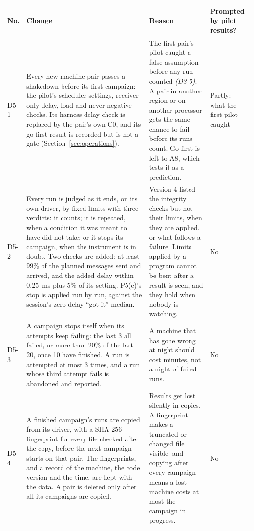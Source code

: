 \documentclass[11pt]{article}
\newcommand{\gl}[1]{{\color{soft}\itshape\small (#1)}}
\begin{document}
{\small
\begin{longtable}{@{}p{1.0cm} >{\raggedright\arraybackslash}p{6.6cm} >{\raggedright\arraybackslash}p{5.9cm} >{\raggedright\arraybackslash}p{1.9cm}@{}}
\toprule
\textbf{No.} & \textbf{Change} & \textbf{Reason} & \textbf{Prompted by pilot results?} \\
\midrule
\endhead
D5-1 & Every new machine pair passes a shakedown before its first campaign: the pilot's scheduler-settings, receiver-only-delay, load and never-negative checks. Its harness-delay check is replaced by the pair's own C0, and its go-first result is recorded but is not a gate (Section~\ref{sec:operations}). & The first pair's pilot caught a false assumption before any run counted \gl{D3-5}. A pair in another region or on another processor gets the same chance to fail before its runs count. Go-first is left to A8, which tests it as a prediction. & Partly: what the first pilot caught \\
D5-2 & Every run is judged as it ends, on its own driver, by fixed limits with three verdicts: it counts; it is repeated, when a condition it was meant to have did not take; or it stops its campaign, when the instrument is in doubt. Two checks are added: at least 99\% of the planned messages sent and arrived, and the added delay within 0.25~ms plus 5\% of its setting. P5(c)'s stop is applied run by run, against the session's zero-delay ``got it'' median. & Version 4 listed the integrity checks but not their limits, when they are applied, or what follows a failure. Limits applied by a program cannot be bent after a result is seen, and they hold when nobody is watching. & No \\
D5-3 & A campaign stops itself when its attempts keep failing: the last 3 all failed, or more than 20\% of the last 20, once 10 have finished. A run is attempted at most 3 times, and a run whose third attempt fails is abandoned and reported. & A machine that has gone wrong at night should cost minutes, not a night of failed runs. & No \\
D5-4 & A finished campaign's runs are copied from its driver, with a SHA-256 fingerprint for every file checked after the copy, before the next campaign starts on that pair. The fingerprints, and a record of the machine, the code version and the time, are kept with the data. A pair is deleted only after all its campaigns are copied. & Results get lost silently in copies. A fingerprint makes a truncated or changed file visible, and copying after every campaign means a lost machine costs at most the campaign in progress. & No \\

\end{longtable}}
\end{document}
